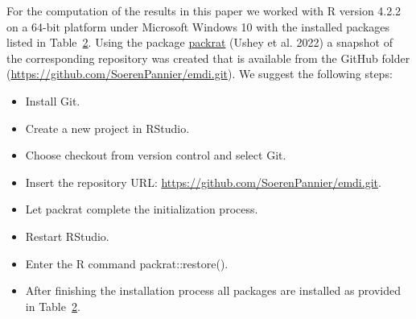 For the computation of the results in this paper we worked with R
version 4.2.2 on a 64-bit platform under Microsoft Windows 10 with the
installed packages listed in
Table~\protect\hyperlink{tab:Rpackages}{2}. Using the package
\href{https://CRAN.R-project.org/package=packrat}{packrat} (Ushey et al. 2022) a
snapshot of the corresponding repository was created that is available
from the GitHub folder (\url{https://github.com/SoerenPannier/emdi.git}). We
suggest the following steps:

\begin{itemize}
\item
  Install Git.
\item
  Create a new project in RStudio.
\item
  Choose checkout from version control and select Git.
\item
  Insert the repository URL:
  \url{https://github.com/SoerenPannier/emdi.git}.
\item
  Let packrat complete the initialization process.
\item
  Restart RStudio.
\item
  Enter the R command packrat::restore().
\item
  After finishing the installation process all packages are installed
  as provided in Table~\protect\hyperlink{tab:Rpackages}{2}.
\end{itemize}

